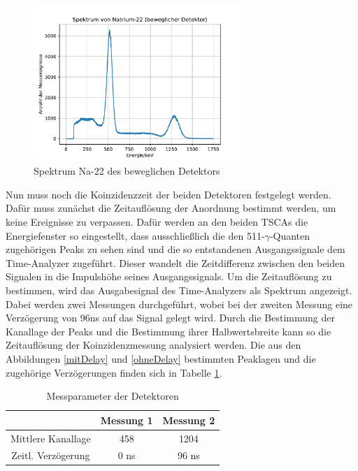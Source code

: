 \documentclass[11pt]{scrartcl}
\begin{document}
\begin{figure}[htbp]  
     \includegraphics[width=0.7\textwidth]{Spektrum_von_Natrium-22_(beweglicher_Detektor).pdf}
  \caption{Spektrum Na-22 des beweglichen Detektors}
  \label{Na-beweg}
\end{figure}

Nun muss noch die Koinzidenzzeit der beiden Detektoren festgelegt werden. Dafür muss zunächst die Zeitauflösung der Anordnung bestimmt werden, um keine Ereignisse zu verpassen. Dafür werden an den beiden TSCAs die Energiefenster so eingestellt, dass ausschließlich die den 511-$\gamma$-Quanten zugehörigen Peaks zu sehen sind und die so entstandenen Ausgangssignale dem Time-Analyzer zugeführt. Dieser wandelt die Zeitdifferenz zwischen den beiden Signalen in die Impulshöhe seines Ausgangssignals. Um die Zeitauflösung zu bestimmen, wird das Ausgabesignal des Time-Analyzers als Spektrum angezeigt. Dabei werden zwei Messungen durchgeführt, wobei bei der zweiten Messung eine Verzögerung von 96ns auf das Signal gelegt wird. Durch die Bestimmung der Kanallage der Peaks und die Bestimmung ihrer Halbwertsbreite kann so die Zeitauflösung der Koinzidenzmessung analysiert werden. Die aus den Abbildungen \ref{mitDelay} und \ref{ohneDelay} bestimmten Peaklagen und die zugehörige Verzögerungen finden sich in Tabelle \ref{zeit}. 

\begin{table}[h]
	\caption{Messparameter der Detektoren}
	\begin{tabular}{|c|c|c|}
	\hline
	 & Messung 1 & Messung 2\\ \hline
	 Mittlere Kanallage & 458 & 1204\\ \hline
	 Zeitl. Verzögerung & 0 ns & 96 ns\\ \hline
	\end{tabular}
\label{zeit}
\end{table}
\end{document}
